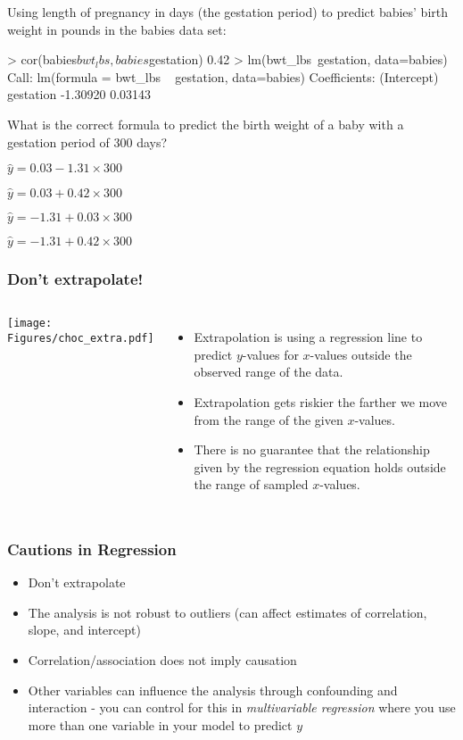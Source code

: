 \begin{frame}[fragile]
Using length of pregnancy in days (the gestation period) to predict babies' birth weight in pounds in the babies data set:
\begin{lcverbatim}
> cor(babies$bwt_lbs,babies$gestation)
0.42
> lm(bwt_lbs~gestation, data=babies)
Call:
lm(formula = bwt_lbs ~ gestation, data=babies)
Coefficients:
   (Intercept)        gestation
      -1.30920          0.03143
\end{lcverbatim}
\begin{clicker}{\small{What is the correct formula to predict the birth weight of a baby with a gestation period of 300 days?}}
\begin{enumerate}
    \small{
    \item
    $\hat{y} = 0.03 - 1.31 \times 300$
    \item
    $\hat{y} = 0.03 + 0.42 \times 300$
    \item
    $\hat{y} = -1.31 + 0.03 \times 300$
     \item
     $\hat{y} = -1.31 + 0.42 \times 300$}
\end{enumerate}
\end{clicker}
\end{frame}


\begin{frame}
\frametitle{Don't extrapolate!}
\begin{columns}
\texttt{[image: Figures/choc\_extra.pdf]}\\
\begin{itemize}
    \item
    Extrapolation is using a regression line to predict $y$-values for $x$-values outside the observed range of the data.
    \item
    Extrapolation gets riskier the farther we move from the range of the given $x$-values.
    \item
    There is no guarantee that the relationship given by the regression equation holds outside the range of sampled $x$-values.
\end{itemize}
\end{columns}
\end{frame}

\begin{frame}
\frametitle{Cautions in Regression}
\begin{itemize}
    \item
    Don't extrapolate
    \item
    The analysis is not robust to outliers (can affect estimates of correlation, slope, and intercept)
    \item
    Correlation/association does not imply causation
    \item
    Other variables can influence the analysis through confounding and interaction - you can control for this in \emph{multivariable regression} where you use more than one variable in your model to predict $y$
\end{itemize}
\end{frame}

